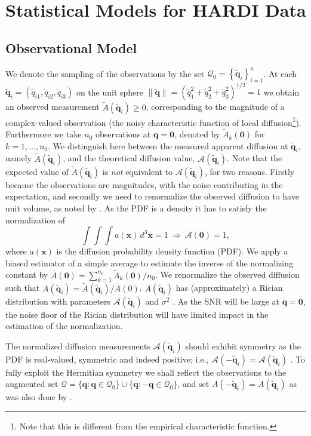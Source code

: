 \documentclass[dvips,aoas,preprint]{imsart}
\numberwithin{equation}{section}
\theoremstyle{plain}
\newcommand{\bq}{\mathbf{q}}
\newcommand{\q}{\mathbf{q}}
\newcommand{\tbq}{\tilde{\bq}}
\newcommand{\x}{\mathbf{x}}
\newcommand{\cA}{\mathcal{A}}
\newcommand{\cQ}{\mathcal{Q}}
\newcommand{\bld}[1]{\mathbf{#1}}
\newcommand{\wt}[1]{\widetilde{#1}}
\newcommand{\ol}[1]{\overline{#1}}
\begin{document}
\section{Statistical Models for HARDI Data}

\subsection{Observational Model}

We denote the sampling of the observations by the set
$\cQ_0=\left\{\tbq_i\right\}_{i=1}^n$.  At each
$\tbq_i=(\tilde{q}_{i1},\tilde{q}_{i2},\tilde{q}_{i3})$ on the unit
sphere
$\|\tbq\|=(\tilde{q}_{1}^2+\tilde{q}_{2}^2+\tilde{q}_{3}^2)^{1/2}=1$
we obtain an observed measurement $\wt{A}(\tbq_i)\ge0$, corresponding
to the magnitude of a complex-valued observation (the noisy
characteristic function of local diffusion\footnote{Note that this is
  different from the empirical characteristic function.}).
Furthermore we take $n_0$ observations at $\q=\bld{0}$, denoted by
$\wt{A}_k(\bld{0})$ for $k=1,\dots,n_0$.  We distinguish here between
the measured apparent diffusion at $\tbq_i$, namely $\wt{A}(\tbq_i)$,
and the theoretical diffusion value, $\cA(\tbq_i)$. Note that the
expected value of $\wt{A}(\tbq_i)$ is {\em not} equivalent to
$\cA(\tbq_i)$, for two reasons. Firstly because the observations are
magnitudes, with the noise contributing in the expectation, and
secondly we need to renormalize the observed diffusion to have unit
volume, as noted by \citet{Alexander2005}. As the PDF is a density it
has to satisfy the normalization of
\begin{equation}
  \int \int \int a(\x) \, d^3\x = 1 ~ \Rightarrow ~ \cA(\bld{0}) = 1,
\end{equation}
where $a(\x)$ is the diffusion probability density function (PDF).  We
apply a biased estimator of a simple average to estimate the inverse
of the normalizing constant by
$\ol{A}(\bld{0})=\sum_{k=1}^{n_0}\wt{A}_k(\bld{0})/n_0$.  We
renormalize the observed diffusion such that
$A(\tbq_i)=\wt{A}(\tbq_i)/\ol{A}(0)$.  $A(\tbq_i)$ has (approximately)
a Rician distribution with parameters $\cA(\tbq_i)$ and $\sigma^2$
\citep{gud-pat:Rician}.  As the SNR will be large at $\q=\bld{0}$, the
noise floor of the Rician distribution will have limited impact in the
estimation of the normalization.

The normalized diffusion measurements $\cA(\tbq_i)$ should exhibit
symmetry as the PDF is real-valued, symmetric and indeed positive;
i.e., $\cA(-\tbq_i)=\cA(\tbq_i)$ \citep{Wedeen05}.  To fully exploit
the Hermitian symmetry we shall reflect the observations to the
augmented set $\cQ=\{\q:\q\in\cQ_0\}\cup\{\q:-\q\in\cQ_0\}$, and set
$A(-\tbq_i)=A(\tbq_i)$ as was also done by \citet{Jansons}.
\end{document}
